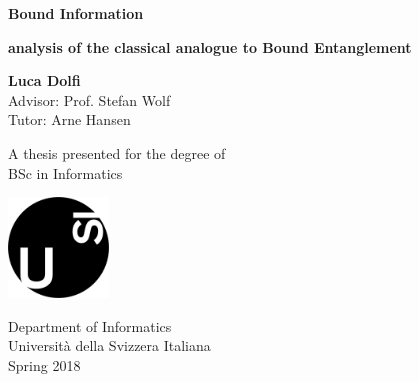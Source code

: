 \begin{titlepage}
    \begin{center}
        \vspace*{1cm}
        
        \Huge
        \textbf{Bound Information}
        
        \vspace{0.5cm}
        \LARGE
        \textbf{analysis of the classical analogue to Bound Entanglement}
        
        \vspace{1.5cm}
        
        \textbf{Luca Dolfi}\\ 
         Advisor: Prof. Stefan Wolf \\ 
         Tutor: Arne Hansen \\
        
        \vfill
        
        A thesis presented for the degree of\\
        BSc in Informatics
        
        \vspace{0.8cm}
        
        \includegraphics[width=0.2\textwidth]{images/usi-immagini-logo-formatted.png}
        
        \Large
        Department of Informatics\\
        Universit\`a della Svizzera Italiana\\
        Spring 2018
        
    \end{center}
\end{titlepage}
